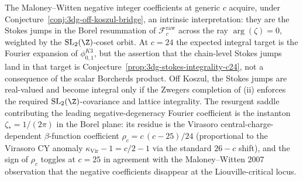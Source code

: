 \begin{remark}
\label{rem:3dg-off-koszul-resurgent-saddle}
%
%
The Maloney--Witten negative integer coefficients at generic $c$
acquire, under Conjecture~\ref{conj:3dg-off-koszul-bridge}, an
intrinsic interpretation: they are the Stokes jumps in the Borel
resummation of $\mathcal F^{\mathrm{raw}}_{c}$ across the ray
$\arg(\zeta) = 0$, weighted by the $\mathrm{SL}_{2}(\Z)$-coset
orbit. At \(c=24\) the expected integral target is the
Fourier expansion of \(\phi_{0,1}^{K3}\), but the assertion that the
chain-level Stokes jumps land in that target is
Conjecture~\ref{prop:3dg-stokes-integrality-c24}, not a consequence
of the scalar Borcherds product. Off Koszul, the Stokes jumps are
real-valued and become integral only if the Zwegers completion of
\textup{(ii)} enforces the required \(\mathrm{SL}_{2}(\Z)\)-covariance
and lattice integrality.
The resurgent saddle contributing the leading negative-degeneracy
Fourier coefficient is the instanton
$\zeta_{\ast} = 1/(2\pi)$ in the Borel plane: its residue is the
Virasoro central-charge-dependent $\beta$-function coefficient
$\rho_{c} = c\,(c - 25)/24$ (proportional to the Virasoro CY anomaly
$\kappa_{\mathrm{Vir}} - 1 = c/2 - 1$ via the standard $26 - c$
shift), and the sign of $\rho_{c}$ toggles at $c = 25$ in agreement
with the Maloney--Witten 2007 observation that the negative
coefficients disappear at the Liouville-critical locus.
\end{remark}

